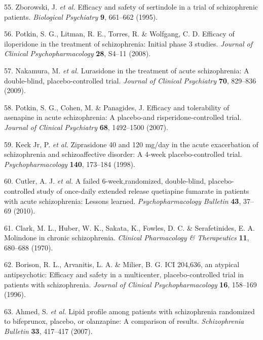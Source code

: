 \documentclass[9pt,english,,jou,floatsintext]{apa6}
\begin{document}
\hypertarget{ref-Zborowski1995}{}
55. Zborowski, J. \emph{et al.} Efficacy and safety of sertindole in a
trial of schizophrenic patients. \emph{Biological Psychiatry}
\textbf{9}, 661--662 (1995).

\hypertarget{ref-Potkin2008}{}
56. Potkin, S. G., Litman, R. E., Torres, R. \& Wolfgang, C. D. Efficacy
of iloperidone in the treatment of schizophrenia: Initial phase 3
studies. \emph{Journal of Clinical Psychopharmacology} \textbf{28},
S4--11 (2008).

\hypertarget{ref-Nakamura2009}{}
57. Nakamura, M. \emph{et al.} Lurasidone in the treatment of acute
schizophrenia: A double-blind, placebo-controlled trial. \emph{Journal
of Clinical Psychiatry} \textbf{70}, 829--836 (2009).

\hypertarget{ref-Potkin2007}{}
58. Potkin, S. G., Cohen, M. \& Panagides, J. Efficacy and tolerability
of asenapine in acute schizophrenia: A placebo-and
risperidone-controlled trial. \emph{Journal of Clinical Psychiatry}
\textbf{68}, 1492--1500 (2007).

\hypertarget{ref-Keck1998}{}
59. Keck Jr, P. \emph{et al.} Ziprasidone 40 and 120 mg/day in the acute
exacerbation of schizophrenia and schizoaffective disorder: A 4-week
placebo-controlled trial. \emph{Psychopharmacology} \textbf{140},
173--184 (1998).

\hypertarget{ref-Cutler2010}{}
60. Cutler, A. J. \emph{et al.} A failed 6-week,randomized,
double-blind, placebo-controlled study of once-daily extended release
quetiapine fumarate in patients with acute schizophrenia: Lessons
learned. \emph{Psychopharmacology Bulletin} \textbf{43}, 37--69 (2010).

\hypertarget{ref-Clark1970}{}
61. Clark, M. L., Huber, W. K., Sakata, K., Fowles, D. C. \&
Serafetinides, E. A. Molindone in chronic schizophrenia. \emph{Clinical
Pharmacology \& Therapeutics} \textbf{11}, 680--688 (1970).

\hypertarget{ref-Borison1996}{}
62. Borison, R. L., Arvanitis, L. A. \& Milier, B. G. ICI 204,636, an
atypical antipsychotic: Efficacy and safety in a multicenter,
placebo-controlled trial in patients with schizophrenia. \emph{Journal
of Clinical Psychopharmacology} \textbf{16}, 158--169 (1996).

\hypertarget{ref-Ahmed2007}{}
63. Ahmed, S. \emph{et al.} Lipid profile among patients with
schizophrenia randomized to bifeprunox, placebo, or olanzapine: A
comparison of results. \emph{Schizophrenia Bulletin} \textbf{33},
417--417 (2007).
\end{document}
